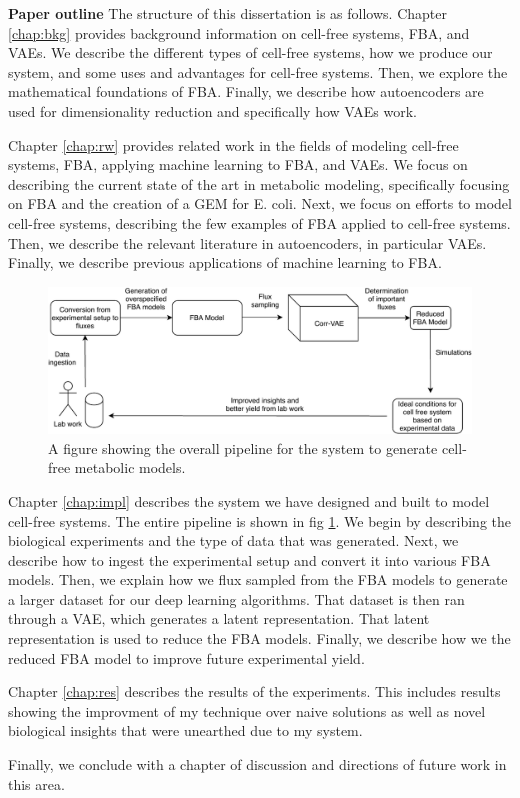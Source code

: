 \textbf{Paper outline}
The structure of this dissertation is as follows.
Chapter \ref{chap:bkg} provides background information on cell-free systems, FBA, and VAEs.
We describe the different types of cell-free systems, how we produce our system, and some uses and advantages for cell-free systems.
Then, we explore the mathematical foundations of FBA.
Finally, we describe how autoencoders are used for dimensionality reduction and specifically how VAEs work.

Chapter \ref{chap:rw} provides related work in the fields of modeling cell-free systems, FBA, applying machine learning to FBA, and VAEs.
We focus on describing the current state of the art in metabolic modeling, specifically focusing on FBA and the creation of a GEM for E. coli.
Next, we focus on efforts to model cell-free systems, describing the few examples of FBA applied to cell-free systems.
Then, we describe the relevant literature in autoencoders, in particular VAEs.
Finally, we describe previous applications of machine learning to FBA.

\begin{figure}[t!]
\begin{center}
\includegraphics[width=\textwidth]{figs/SystemOverview.pdf}
\end{center}
\label{fig:overview}
\caption{A figure showing the overall pipeline for the system to generate cell-free metabolic models.}
\end{figure}

Chapter \ref{chap:impl} describes the system we have designed and built to model cell-free systems.
The entire pipeline is shown in fig \ref{fig:overview}.
We begin by describing the biological experiments and the type of data that was generated.
Next, we describe how to ingest the experimental setup and convert it into various FBA models.
Then, we explain how we flux sampled from the FBA models to generate a larger dataset for our deep learning algorithms.
That dataset is then ran through a VAE, which generates a latent representation.
That latent representation is used to reduce the FBA models.
Finally, we describe how we the reduced FBA model to improve future experimental yield.

Chapter \ref{chap:res} describes the results of the experiments.
This includes results showing the improvment of my technique over naive solutions as well as novel biological insights that were unearthed due to my system.

Finally, we conclude with a chapter of discussion and directions of future work in this area.
